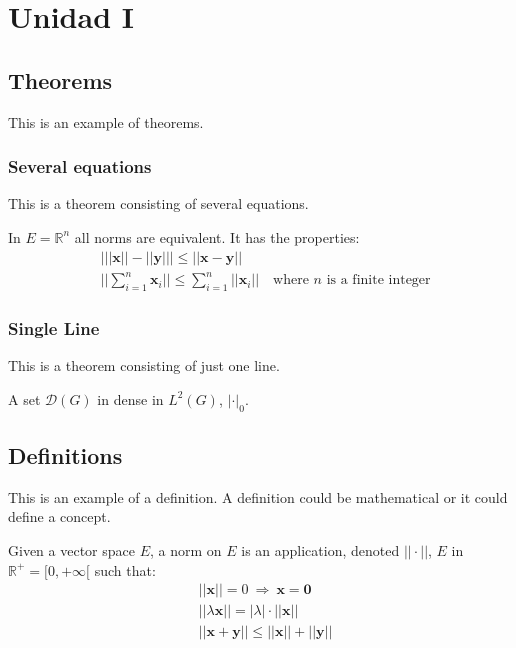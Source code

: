 \documentclass[
	12pt, %
	fleqn, %
	a4paper, %
	oneside, %
]{LegrandOrangeBook}
\begin{document}
\chapter{Unidad I}

\section{Theorems}

This is an example of theorems.

\subsection{Several equations}
This is a theorem consisting of several equations.

\begin{theorem}
In $E=\mathbb{R}^n$ all norms are equivalent. It has the properties:
\begin{align}
& \big| ||\mathbf{x}|| - ||\mathbf{y}|| \big|\leq || \mathbf{x}- \mathbf{y}||\\
&  ||\sum_{i=1}^n\mathbf{x}_i||\leq \sum_{i=1}^n||\mathbf{x}_i||\quad\text{where $n$ is a finite integer}
\end{align}
\end{theorem}

\subsection{Single Line}
This is a theorem consisting of just one line.

\begin{theorem}
A set $\mathcal{D}(G)$ in dense in $L^2(G)$, $|\cdot|_0$. 
\end{theorem}


\section{Definitions}

This is an example of a definition. A definition could be mathematical or it could define a concept.

\begin{definition}
Given a vector space $E$, a norm on $E$ is an application, denoted $||\cdot||$, $E$ in $\mathbb{R}^+=[0,+\infty[$ such that:
\begin{align}
& ||\mathbf{x}||=0\ \Rightarrow\ \mathbf{x}=\mathbf{0}\\
& ||\lambda \mathbf{x}||=|\lambda|\cdot ||\mathbf{x}||\\
& ||\mathbf{x}+\mathbf{y}||\leq ||\mathbf{x}||+||\mathbf{y}||
\end{align}
\end{definition}
\end{document}
